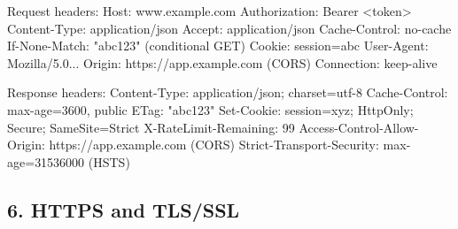\documentclass[11pt]{article}
\newenvironment{Shaded}{\begin{snugshade}}{\end{snugshade}}
\newcommand{\BuiltInTok}[1]{\textcolor[rgb]{0.50,0.55,0.55}{#1}}
\newcommand{\DecValTok}[1]{\textcolor[rgb]{0.96,0.45,0.00}{#1}}
\newcommand{\FloatTok}[1]{\textcolor[rgb]{0.96,0.45,0.00}{#1}}
\newcommand{\NormalTok}[1]{\textcolor[rgb]{0.81,0.81,0.76}{#1}}
\newcommand{\OperatorTok}[1]{\textcolor[rgb]{0.81,0.81,0.76}{#1}}
\newcommand{\StringTok}[1]{\textcolor[rgb]{0.96,0.31,0.31}{#1}}
\newcommand{\VariableTok}[1]{\textcolor[rgb]{0.15,0.68,0.68}{#1}}
\begin{document}
\begin{Shaded}
\begin{Highlighting}[]
\NormalTok{Request headers:}
\NormalTok{  Host: www.example.com}
\NormalTok{  Authorization: Bearer }\OperatorTok{\textless{}}\NormalTok{token}\OperatorTok{\textgreater{}}
\NormalTok{  Content}\OperatorTok{{-}}\NormalTok{Type: application}\OperatorTok{/}\NormalTok{json}
\NormalTok{  Accept: application}\OperatorTok{/}\NormalTok{json}
\NormalTok{  Cache}\OperatorTok{{-}}\NormalTok{Control: no}\OperatorTok{{-}}\NormalTok{cache}
\NormalTok{  If}\OperatorTok{{-}}\VariableTok{None}\OperatorTok{{-}}\NormalTok{Match: }\StringTok{"abc123"}\NormalTok{  (conditional GET)}
\NormalTok{  Cookie: session}\OperatorTok{=}\NormalTok{abc}
\NormalTok{  User}\OperatorTok{{-}}\NormalTok{Agent: Mozilla}\OperatorTok{/}\FloatTok{5.0}\NormalTok{...}
\NormalTok{  Origin: https:}\OperatorTok{//}\NormalTok{app.example.com  (CORS)}
\NormalTok{  Connection: keep}\OperatorTok{{-}}\NormalTok{alive}

\NormalTok{Response headers:}
\NormalTok{  Content}\OperatorTok{{-}}\NormalTok{Type: application}\OperatorTok{/}\NormalTok{json}\OperatorTok{;}\NormalTok{ charset}\OperatorTok{=}\NormalTok{utf}\OperatorTok{{-}}\DecValTok{8}
\NormalTok{  Cache}\OperatorTok{{-}}\NormalTok{Control: }\BuiltInTok{max}\OperatorTok{{-}}\NormalTok{age}\OperatorTok{=}\DecValTok{3600}\NormalTok{, public}
\NormalTok{  ETag: }\StringTok{"abc123"}
\NormalTok{  Set}\OperatorTok{{-}}\NormalTok{Cookie: session}\OperatorTok{=}\NormalTok{xyz}\OperatorTok{;}\NormalTok{ HttpOnly}\OperatorTok{;}\NormalTok{ Secure}\OperatorTok{;}\NormalTok{ SameSite}\OperatorTok{=}\NormalTok{Strict}
\NormalTok{  X}\OperatorTok{{-}}\NormalTok{RateLimit}\OperatorTok{{-}}\NormalTok{Remaining: }\DecValTok{99}
\NormalTok{  Access}\OperatorTok{{-}}\NormalTok{Control}\OperatorTok{{-}}\NormalTok{Allow}\OperatorTok{{-}}\NormalTok{Origin: https:}\OperatorTok{//}\NormalTok{app.example.com  (CORS)}
\NormalTok{  Strict}\OperatorTok{{-}}\NormalTok{Transport}\OperatorTok{{-}}\NormalTok{Security: }\BuiltInTok{max}\OperatorTok{{-}}\NormalTok{age}\OperatorTok{=}\DecValTok{31536000}\NormalTok{  (HSTS)}
\end{Highlighting}
\end{Shaded}

\subsection{6. HTTPS and TLS/SSL}\label{6-https-and-tlsssl}
\end{document}
